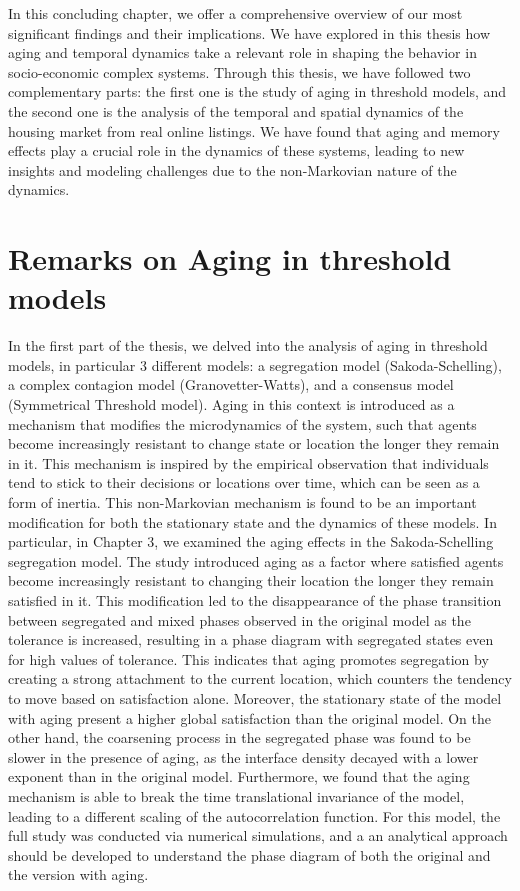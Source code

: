 In this concluding chapter, we offer a comprehensive overview of our most significant findings and their implications. We have explored in this thesis how aging and temporal dynamics take a relevant role in shaping the behavior in socio-economic complex systems. Through this thesis, we have followed two complementary parts: the first one is the study of aging in threshold models, and the second one is the analysis of the temporal and spatial dynamics of the housing market from real online listings. We have found that aging and memory effects play a crucial role in the dynamics of these systems, leading to new insights and modeling challenges due to the non-Markovian nature of the dynamics.

\section{Remarks on Aging in threshold models \label{sec:aging_threshold_models}}

In the first part of the thesis, we delved into the analysis of aging in threshold models, in particular 3 different models: a segregation model (Sakoda-Schelling), a complex contagion model (Granovetter-Watts), and a consensus model (Symmetrical Threshold model). Aging in this context is introduced as a mechanism that modifies the microdynamics of the system, such that agents become increasingly resistant to change state or location the longer they remain in it. This mechanism is inspired by the empirical observation that individuals tend to stick to their decisions or locations over time, which can be seen as a form of inertia. This non-Markovian mechanism is found to be an important modification for both the stationary state and the dynamics of these models. In particular, in Chapter 3, we examined the aging effects in the Sakoda-Schelling segregation model. The study introduced aging as a factor where satisfied agents become increasingly resistant to changing their location the longer they remain satisfied in it. This modification led to the disappearance of the phase transition between segregated and mixed phases observed in the original model as the tolerance is increased, resulting in a phase diagram with segregated states even for high values of tolerance. This indicates that aging promotes segregation by creating a strong attachment to the current location, which counters the tendency to move based on satisfaction alone. Moreover, the stationary state of the model with aging present a higher global satisfaction than the original model. On the other hand, the coarsening process in the segregated phase was found to be slower in the presence of aging, as the interface density decayed with a lower exponent than in the original model. Furthermore, we found that the aging mechanism is able to break the time translational invariance of the model, leading to a different scaling of the autocorrelation function. For this model, the full study was conducted via numerical simulations, and a an analytical approach should be developed to understand the phase diagram of both the original and the version with aging.

